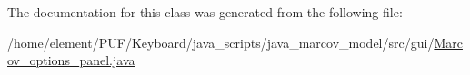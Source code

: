 The documentation for this class was generated from the following file\+:\begin{DoxyCompactItemize}
\item 
/home/element/\+P\+U\+F/\+Keyboard/java\+\_\+scripts/java\+\_\+marcov\+\_\+model/src/gui/\hyperlink{_marcov__options__panel_8java}{Marcov\+\_\+options\+\_\+panel.\+java}\end{DoxyCompactItemize}
